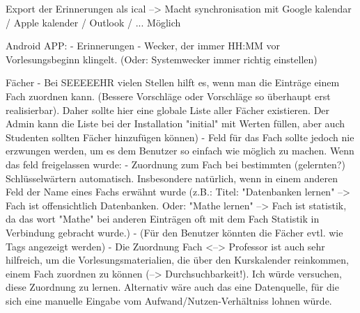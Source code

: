 Export der Erinnerungen als ical --> Macht synchronisation mit Google kalendar / Apple kalender / Outlook / ... Möglich

Android APP:
    - Erinnerungen
    - Wecker, der immer HH:MM vor Vorlesungsbeginn klingelt. (Oder: Systemwecker immer richtig einstellen)

Fächer
    - Bei SEEEEEHR vielen Stellen hilft es, wenn man die Einträge einem Fach zuordnen kann. (Bessere Vorschläge oder Vorschläge so überhaupt erst realisierbar). Daher sollte hier eine globale Liste aller Fächer existieren. Der Admin kann die Liste bei der Installation "initial" mit Werten füllen, aber auch Studenten sollten Fächer hinzufügen können)
    - Feld für das Fach sollte jedoch nie erzwungen werden, um es dem Benutzer so einfach wie möglich zu machen. Wenn das feld freigelassen wurde: 
    - Zuordnung zum Fach bei bestimmten (gelernten?) Schlüsselwärtern automatisch. Insbesondere natürlich, wenn in einem anderen Feld der Name eines Fachs erwähnt wurde (z.B.: Titel: "Datenbanken lernen" --> Fach ist offensichtlich Datenbanken. Oder: "Mathe lernen" --> Fach ist statistik, da das wort "Mathe" bei anderen Einträgen oft mit dem Fach Statistik in Verbindung gebracht wurde.)
    - (Für den Benutzer könnten die Fächer evtl. wie Tags angezeigt werden)
    - Die Zuordnung Fach <--> Professor ist auch sehr hilfreich, um die Vorlesungsmaterialien, die über den Kurskalender reinkommen, einem Fach zuordnen zu können (--> Durchsuchbarkeit!). Ich würde versuchen, diese Zuordnung zu lernen. Alternativ wäre auch das eine Datenquelle, für die sich eine manuelle Eingabe vom Aufwand/Nutzen-Verhältniss lohnen würde.

